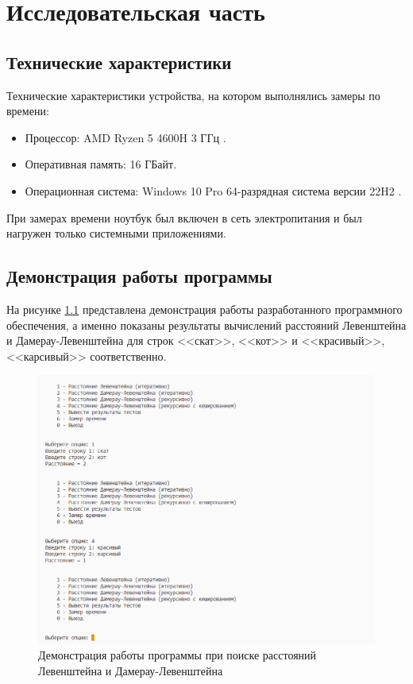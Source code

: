 \chapter{Исследовательская часть}

\section{Технические характеристики}

Технические характеристики устройства, на котором выполнялись замеры по времени:

\begin{itemize}
	\item Процессор: AMD Ryzen 5 4600H 3 ГГц \cite{amd}.
	\item Оперативная память: 16 ГБайт.
	\item Операционная система: Windows 10 Pro 64-разрядная система версии 22H2 \cite{windows}.
\end{itemize}

При замерах времени ноутбук был включен в сеть электропитания и был нагружен только системными приложениями.


\section{Демонстрация работы программы}

На рисунке \ref{img:demonstration} представлена демонстрация работы разработанного программного обеспечения, а именно показаны результаты вычислений расстояний Левенштейна и Дамерау-Левенштейна для строк <<скат>>, <<кот>> и <<красивый>>, <<карсивый>> соответственно.  
\clearpage
\begin{figure}[h]
	\centering
	\includegraphics[height=0.7\textheight]{img/program.png}
	\caption{Демонстрация работы программы при поиске расстояний Левенштейна и Дамерау-Левенштейна}
	\label{img:demonstration}
\end{figure}

